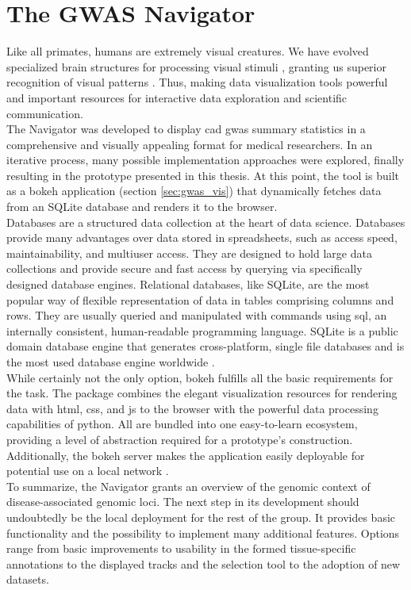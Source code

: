 \section{The GWAS Navigator}
Like all primates, humans are extremely visual creatures. We have evolved specialized brain structures for processing visual stimuli \cite{kaasCurrentResearchOrganization2014}, granting us superior recognition of visual patterns \cite{mattsonSuperiorPatternProcessing2014}. Thus, making data visualization tools powerful and important resources for interactive data exploration and scientific communication.\\
The  Navigator was developed to display \ac{cad} \ac{gwas} summary statistics in a comprehensive and visually appealing format for medical researchers. In an iterative process, many possible implementation approaches were explored, finally resulting in the prototype presented in this thesis. At this point, the tool is built as a bokeh application (section \ref{sec:gwas_vis}) that dynamically fetches data from an SQLite database and renders it to the browser.\\
Databases are a structured data collection at the heart of data science. Databases provide many advantages over data stored in spreadsheets, such as access speed, maintainability, and multiuser access. They are designed to hold large data collections and provide secure and fast access by querying via specifically designed database engines. Relational databases, like SQLite, are the most popular way of flexible representation of data in tables comprising columns and rows. They are usually queried and manipulated with commands using \ac{sql}, an internally consistent, human-readable programming language. \cite{oraclecorporationWhatDatabase2022, oraclecorporationWhatRelationalDatabase2022} SQLite is a public domain database engine that generates cross-platform, single file databases and is the most used database engine worldwide \cite{thesqliteconsortiumSQLite2022}.\\
While certainly not the only option, bokeh fulfills all the basic requirements for the task. The package combines the elegant visualization resources for rendering data with \ac{html}, \ac{css}, and \ac{js} to the browser with the powerful data processing capabilities of python. All are bundled into one easy-to-learn ecosystem, providing a level of abstraction required for a prototype's construction. Additionally, the bokeh server makes the application easily deployable for potential use on a local network \cite{bokehdevelopmentteamBokehPythonLibrary2022}. \\
To summarize, the  Navigator grants an overview of the genomic context of disease-associated genomic loci. The next step in its development should undoubtedly be the local deployment for the rest of the group. It provides basic functionality and the possibility to implement many additional features. Options range from basic improvements to usability in the formed tissue-specific annotations to the displayed tracks and the selection tool to the adoption of new datasets.


